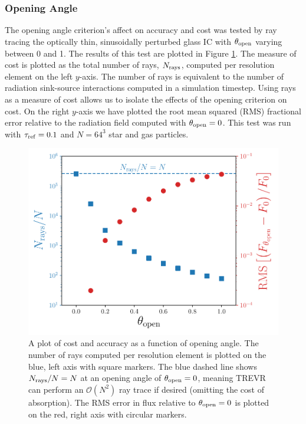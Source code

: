 \documentclass[fleq,usenatbib]{mnras}
\newcommand{\acro}{TREVR}
\newcommand{\bigO}[1]{\mathcal{O}\left(#1\right)}
\newcommand{\tr}{\tau_{\rm ref}}
\newcommand{\tO}{\theta_{\rm open}}
\begin{document}
{\subsubsection{Opening Angle}
The opening angle criterion's affect on accuracy and cost was tested by 
ray tracing the optically thin, sinusoidally perturbed glass IC with $\tO$ 
varying between 0 and 1. The results of this test are plotted in Figure 
\ref{fig:openangle}. The measure of cost is plotted as the total number of 
rays, $N_{\rm rays}$, computed per resolution element on the left $y$-axis. 
The number of rays is equivalent to the number of radiation sink-source 
interactions computed in a simulation timestep. Using rays as a measure of 
cost allows us to isolate the effects of the opening criterion on cost. On 
the right $y$-axis we have plotted the root mean squared (RMS) fractional 
error relative to the radiation field computed with $\tO=0$. This test was run 
with $\tr = 0.1$ and $N=64^3$ star and gas particles.
\begin{figure}
\includegraphics[width=1\linewidth]{Figures/opening_angle.pdf}
\caption{A plot of cost and accuracy as a function of opening angle. The 
number of rays computed per resolution element is plotted on the blue, 
left axis with square markers. The blue dashed line shows $N_{\rm rays}/N 
= N$ at an opening angle of $\tO=0$, meaning \acro{} can perform an 
$\bigO{N^2}$ ray trace if desired (omitting the cost of absorption). The RMS 
error in flux relative to $\tO=0$ is plotted on the red, right axis with 
circular markers.}
\label{fig:openangle}
\end{figure}

}
\end{document}
